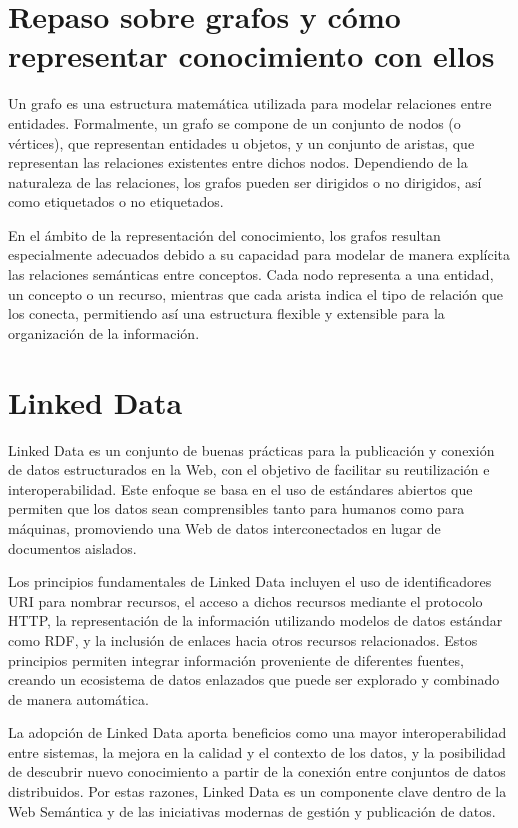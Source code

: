 \documentclass{article}
\begin{document}
\section{Repaso sobre grafos y cómo representar conocimiento con ellos}
Un grafo es una estructura matemática utilizada para modelar relaciones entre entidades. Formalmente, un grafo se compone de un conjunto de nodos (o vértices), que representan entidades u objetos, y un conjunto de aristas, que representan las relaciones existentes entre dichos nodos. Dependiendo de la naturaleza de las relaciones, los grafos pueden ser dirigidos o no dirigidos, así como etiquetados o no etiquetados.

En el ámbito de la representación del conocimiento, los grafos resultan especialmente adecuados debido a su capacidad para modelar de manera explícita las relaciones semánticas entre conceptos. Cada nodo representa  a una entidad, un concepto o un recurso, mientras que cada arista indica el tipo de relación que los conecta, permitiendo así una estructura flexible y extensible para la organización de la información.

\section{Linked Data}

Linked Data es un conjunto de buenas prácticas para la publicación y conexión de datos estructurados en la Web, con el objetivo de facilitar su reutilización e interoperabilidad. Este enfoque se basa en el uso de estándares abiertos que permiten que los datos sean comprensibles tanto para humanos como para máquinas, promoviendo una Web de datos interconectados en lugar de documentos aislados.

Los principios fundamentales de Linked Data incluyen el uso de identificadores URI para nombrar recursos, el acceso a dichos recursos mediante el protocolo HTTP, la representación de la información utilizando modelos de datos estándar como RDF, y la inclusión de enlaces hacia otros recursos relacionados. Estos principios permiten integrar información proveniente de diferentes fuentes, creando un ecosistema de datos enlazados que puede ser explorado y combinado de manera automática.

La adopción de Linked Data aporta beneficios como una mayor interoperabilidad entre sistemas, la mejora en la calidad y el contexto de los datos, y la posibilidad de descubrir nuevo conocimiento a partir de la conexión entre conjuntos de datos distribuidos. Por estas razones, Linked Data es un componente clave dentro de la Web Semántica y de las iniciativas modernas de gestión y publicación de datos.
\end{document}
